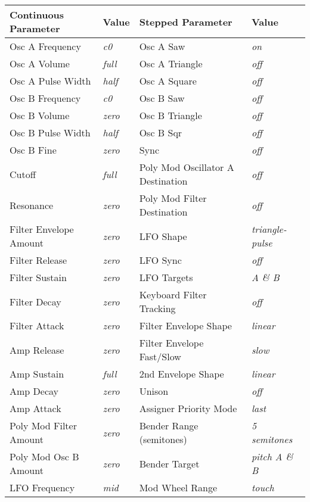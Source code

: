 \begin{longtable}[l]{p{5cm}|p{5cm}|p{5cm}|p{5cm}|} 
\textbf{Continuous Parameter} & \textbf{Value} & \textbf{Stepped Parameter} & \textbf{Value} \\ \hline
Osc A Frequency & \textit{c0} & Osc A Saw & \textit{on} \\ \hline
Osc A Volume & \textit{full} & Osc A Triangle &\textit{off} \\ \hline
Osc A Pulse Width & \textit{half} & Osc A Square & \textit{off} \\ \hline
Osc B Frequency & \textit{c0} & Osc B Saw & \textit{off} \\ \hline
Osc B Volume & \textit{zero} & Osc B Triangle & \textit{off} \\ \hline
Osc B Pulse Width & \textit{half} & Osc B Sqr &\textit{off} \\ \hline
Osc B Fine & \textit{zero} & Sync & \textit{off} \\ \hline
Cutoff & \textit{full} & Poly Mod Oscillator A Destination & \textit{off} \\ \hline
Resonance & \textit{zero} & Poly Mod Filter Destination & \textit{off} \\ \hline
Filter Envelope Amount & \textit{zero} & LFO Shape & \textit{triangle-pulse} \\ \hline
Filter Release & \textit{zero} & LFO Sync & \textit{off} \\ \hline
Filter Sustain & \textit{zero} & LFO Targets & \textit{A \& B} \\ \hline
Filter Decay & \textit{zero} & Keyboard Filter Tracking & \textit{off} \\ \hline
Filter Attack & \textit{zero} & Filter Envelope Shape & \textit{linear} \\ \hline
Amp Release & \textit{zero} & Filter Envelope Fast/Slow & \textit{slow} \\ \hline
Amp Sustain & \textit{full} & 2nd Envelope Shape & \textit{linear} \\ \hline
Amp Decay & \textit{zero} & Unison & \textit{off} \\ \hline
Amp Attack & \textit{zero} & Assigner Priority Mode & \textit{last} \\ \hline
Poly Mod Filter Amount & \textit{zero} & Bender Range (semitones) & \textit{5 semitones} \\ \hline
Poly Mod Osc B Amount & \textit{zero} & Bender Target & \textit{pitch A \& B} \\ \hline
LFO Frequency & \textit{mid} & Mod Wheel Range & \textit{touch} \\ \hline

\end{longtable}
